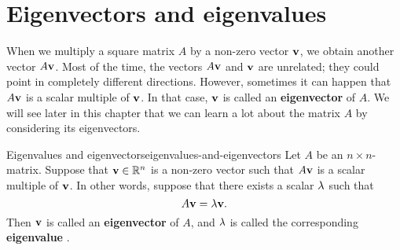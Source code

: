 \section{Eigenvectors and eigenvalues}

When we multiply a square matrix $A$ by a non-zero vector $\mbox{\bf v}$,
we obtain another vector $A\mbox{\bf v}$. Most of the time, the vectors
$A\mbox{\bf v}$ and $\mbox{\bf v}$ are unrelated; they could point in
completely different directions. However, sometimes it can happen that
$A\mbox{\bf v}$ is a scalar multiple of $\mbox{\bf v}$. In that case,
$\mbox{\bf v}$ is called an \textbf{eigenvector} of $A$. We will see later
in this chapter that we can learn a lot about the matrix $A$ by
considering its eigenvectors.

\begin{definition}{Eigenvalues and eigenvectors}{eigenvalues-and-eigenvectors}
  Let $A$ be an $n\times n$-matrix. Suppose that $\mbox{\bf v}\in\mathbb{R}^n$ is
  a non-zero vector such that $A\mbox{\bf v}$ is a scalar multiple of
  $\mbox{\bf v}$. In other words, suppose that there exists a scalar
  $\lambda$ such that
  \begin{equation}\label{eigen1}
    A\mbox{\bf v}=\lambda\mbox{\bf v}.
  \end{equation}
  Then $\mbox{\bf v}$ is called an \textbf{eigenvector}%
   of $A$, and $\lambda$ is called the
  corresponding \textbf{eigenvalue}%
  .
\end{definition}

